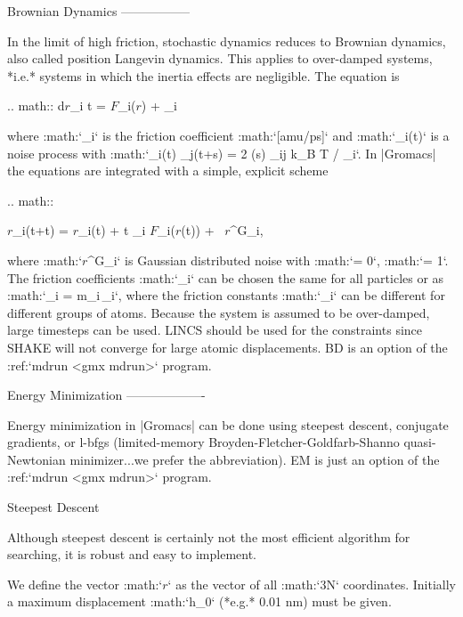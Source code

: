 {Brownian Dynamics
-----------------

In the limit of high friction, stochastic dynamics reduces to Brownian
dynamics, also called position Langevin dynamics. This applies to
over-damped systems, *i.e.* systems in which the inertia effects are
negligible. The equation is

.. math:: {{\mbox{d}}{\mbox{\boldmath ${r}$}}_i t} =  {\mbox{\boldmath ${F}$}}_i({\mbox{\boldmath ${r}$}}) + {}_i

where :math:`\gamma_i` is the friction coefficient
:math:`[\mbox{amu/ps}]` and
:math:`{}_i\!\!(t)` is a noise
process with
:math:`_i\!\!(t) {}_j\!\!(t+s) \rangle = 2 \delta(s) \delta_{ij} k_B T / \gamma_i`. 
In |Gromacs| the equations
are integrated with a simple, explicit scheme

.. math::

   {\mbox{\boldmath ${r}$}}_i(t+\Delta t) = {\mbox{\boldmath ${r}$}}_i(t) +
           {\Delta t \over \gamma_i} {\mbox{\boldmath ${F}$}}_i({\mbox{\boldmath ${r}$}}(t)) 
           + \, {{\mbox{\boldmath ${r}$}}^G}_i,

where :math:`{{\mbox{\boldmath ${r}$}}^G}_i` is Gaussian distributed
noise with :math:`\mu = 0`, :math:`\sigma = 1`. The friction
coefficients :math:`\gamma_i` can be chosen the same for all particles
or as :math:`\gamma_i = m_i\,\gamma_i`, where the friction constants
:math:`\gamma_i` can be different for different groups of atoms. Because
the system is assumed to be over-damped, large timesteps can be used.
LINCS should be used for the constraints since SHAKE will not converge
for large atomic displacements. BD is an option of the
:ref:`mdrun <gmx mdrun>` program.

Energy Minimization
-------------------

Energy minimization in |Gromacs|
can be done using steepest descent, conjugate gradients, or l-bfgs
(limited-memory Broyden-Fletcher-Goldfarb-Shanno quasi-Newtonian
minimizer...we prefer the abbreviation). EM is just an option of the
:ref:`mdrun <gmx mdrun>` program.

Steepest Descent
~~~~~~~~~~~~~~~~

Although steepest descent is certainly not the most efficient algorithm
for searching, it is robust and easy to implement.

We define the vector :math:`{\mbox{\boldmath ${r}$}}` as the vector of
all :math:`3N` coordinates. Initially a maximum displacement :math:`h_0`
(*e.g.* 0.01 nm) must be given.

}

